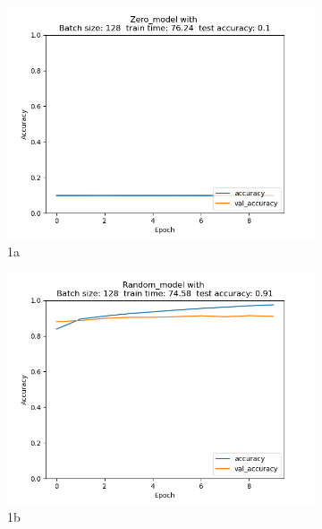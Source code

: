 \documentclass{article}
\begin{document}
\begin{multicols}{2}
\begin{figure}[h!]
	\begin{subfigure}{.3\textwidth}
		\centering
		\includegraphics[width=\linewidth]{../img_1_1_init/acc_plot_Zero_model.png}
		\caption{1a}
		\label{fig:sfig1}
	\end{subfigure}%
	\begin{subfigure}{.3\textwidth}
		\centering
		\includegraphics[width=\linewidth]{../img_1_1_init/acc_plot_Random_model}
		\caption{1b}
		\label{fig:sfig2}
	\end{subfigure}
	\begin{subfigure}{.3\textwidth}
		\centering

\end{subfigure}
\end{figure}
\end{multicols}
\end{document}
